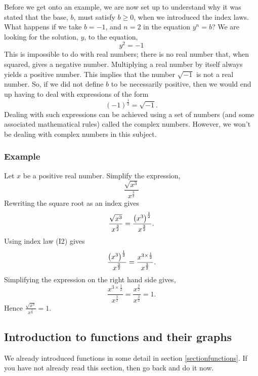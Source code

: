 \noindent Before we get onto an example, we are now set up to understand why it was stated that the base, $b$, must satisfy $b \geq 0$, when we introduced the index laws. What happens if we take $b = -1$, and $n = 2$ in the equation $y^n = b$? We are looking for the solution, $y$, to the equation,
\[
y^2 = -1
\]
This is impossible to do with real numbers; there is no real number that, when squared, gives a negative number. Multiplying a real number by itself always yields a positive number. This implies that the number $\sqrt{-1}$ is not a real number. So, if we did not define $b$ to be necessarily positive, then we would end up having to deal with expressions of the form
\[
(-1)^\frac{1}{2} = \sqrt{-1}.
\]
Dealing with such expressions can be achieved using a set of numbers (and some associated mathematical rules) called the complex numbers. However, we won't be dealing with complex numbers in this subject.

\subsubsection{Example}
Let $x$ be a positive real number. Simplify the expression,
\[
\frac{\sqrt{x^3}}{x^\frac{3}{2}}
\]
Rewriting the square root as an index gives
\[
\frac{\sqrt{x^3}}{x^\frac{3}{2}} = \frac{\left(x^3\right)^\frac{1}{2}}{x^\frac{3}{2}}.
\]
Using index law (I2) gives
\[
\frac{\left(x^3\right)^\frac{1}{2}}{x^\frac{3}{2}} = \frac{x^{3\times\frac{1}{2}}}{x^\frac{3}{2}}.
\]
Simplifying the expression on the right hand side gives,
\[
\frac{x^{3\times\frac{1}{2}}}{x^\frac{3}{2}} = \frac{x^\frac{3}{2}}{x^\frac{3}{2}} = 1.
\]
Hence $\frac{\sqrt{x^3}}{x^\frac{3}{2}} = 1$.




\subsection{Introduction to functions and their graphs}
We already introduced functions in some detail in section \ref{sectionfunctions}. If you have not already read this section, then go back and do it now. \\

